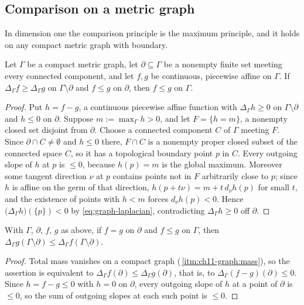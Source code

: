 \subsection{Comparison on a metric graph}
\label{sec:ch16-comparison-graph}

In dimension one the comparison principle is the maximum principle, and it
holds on any compact metric graph with boundary.

\begin{proposition}
\label{prop:ch16-comparison-graph}
Let $\Gamma$ be a compact metric graph, let $\partial\subseteq\Gamma$ be a
nonempty finite set meeting every connected component, and let $f,g$ be
continuous, piecewise affine on $\Gamma$.  If $\Delta_\Gamma f\geq
\Delta_\Gamma g$ on $\Gamma\setminus\partial$ and $f\leq g$ on $\partial$,
then $f\leq g$ on $\Gamma$.
\end{proposition}

\begin{proof}
Put $h=f-g$, a continuous piecewise affine function with
$\Delta_\Gamma h\geq0$ on $\Gamma\setminus\partial$ and $h\leq0$ on
$\partial$.  Suppose $m:=\max_\Gamma h>0$, and let $F=\{h=m\}$, a nonempty
closed set disjoint from $\partial$.  Choose a connected component $C$ of
$\Gamma$ meeting $F$.  Since $\partial\cap C\neq\emptyset$ and $h\leq0$
there, $F\cap C$ is a nonempty proper closed subset of the connected space
$C$, so it has a topological boundary point $p$ in $C$.  Every outgoing
slope of $h$ at $p$ is $\leq0$, because $h(p)=m$ is the global maximum.
Moreover some tangent direction $\nu$ at $p$ contains points not in $F$
arbitrarily close to $p$; since $h$ is affine on the germ of that direction,
$h(p+t\nu)=m+t\,d_\nu h(p)$ for small $t$, and the existence of points with
$h<m$ forces $d_\nu h(p)<0$.  Hence
$\bigl(\Delta_\Gamma h\bigr)(\{p\})<0$ by \eqref{eq:graph-laplacian},
contradicting $\Delta_\Gamma h\geq0$ off $\partial$.
\end{proof}

\begin{corollary}
\label{cor:ch16-graph-mass-comparison}
With $\Gamma$, $\partial$, $f$, $g$ as above, if $f=g$ on $\partial$ and
$f\leq g$ on $\Gamma$, then
$\Delta_\Gamma g(\Gamma\setminus\partial)
 \leq\Delta_\Gamma f(\Gamma\setminus\partial)$.
\end{corollary}

\begin{proof}
Total mass vanishes on a compact graph
(\,\cref{itm:ch11-graph:mass}), so the assertion
is equivalent to
$\Delta_\Gamma f(\partial)\leq\Delta_\Gamma g(\partial)$, that is, to
$\Delta_\Gamma(f-g)(\partial)\leq0$.  Since $h=f-g\leq0$ with $h=0$ on
$\partial$, every outgoing slope of $h$ at a point of $\partial$ is
$\leq0$, so the sum of outgoing slopes at each such point is $\leq0$.
\end{proof}

